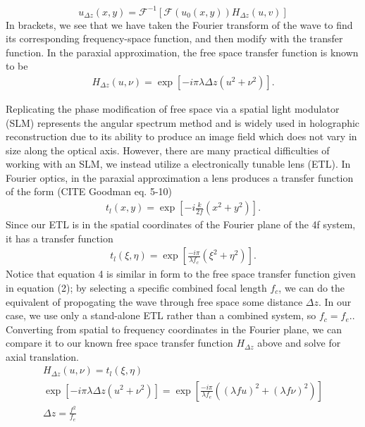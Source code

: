 \begin{equation}
	u_{\Delta z}(x,y) = \mathcal{F}^{-1}\left[ \mathcal{F}(u_0(x,y))H_{\Delta z}(u,v)\right]
\end{equation}
In brackets, we see that we have taken the Fourier transform of the wave to find its corresponding frequency-space function, and then modify with the transfer function. In the paraxial approximation, the free space transfer function is known to be
\begin{gather}
	H_{\Delta z}(u,\nu) = \exp\left[-i \pi \lambda \Delta z (u^2 + \nu^2)\right].
\end{gather}
\par Replicating the phase modification of free space via a spatial light modulator (SLM) represents the angular spectrum method and is widely used in holographic reconstruction due to its ability to produce an image field which does not vary in size along the optical axis. However, there are many practical difficulties of working with an SLM, we instead utilize a electronically tunable lens (ETL). In Fourier optics, in the paraxial approximation a lens produces a transfer function of the form (CITE Goodman eq. 5-10)
\begin{gather}
	t_l(x,y) =\exp \left[ - i \frac{k}{2f}\left(x^2 + y^2\right)\right].
\end{gather}
Since our ETL is in the spatial coordinates of the Fourier plane of the 4f system, it has a transfer function
\begin{gather}
	t_l(\xi, \eta) = \exp\left[ \frac{-i \pi}{\lambda f_c}\left(\xi^2 + \eta^2\right)\right].
\end{gather}
Notice that equation 4 is similar in form to the free space transfer function given in equation (2); by selecting a specific combined focal length $f_c$, we can do the equivalent of propogating the wave through free space some distance $\Delta z$. In our case, we use only a stand-alone ETL rather than a combined system, so $f_c = f_e.$. Converting from  spatial to frequency coordinates in the Fourier plane,  we can compare it to our known free space transfer function $H_{\Delta z}$ above and solve for axial translation.
\begin{gather} 
		H_{\Delta z}(u,\nu)=t_l(\xi, \eta) \\
		 \exp\left[-i \pi \lambda \Delta z (u^2 + \nu^2)\right] = \exp\left[ \frac{-i \pi}{\lambda f_e}\left((\lambda f u)^2 + (\lambda f \nu)^2\right)\right]\\
		\Delta z = \frac{f^2}{f_e}
\end{gather}


